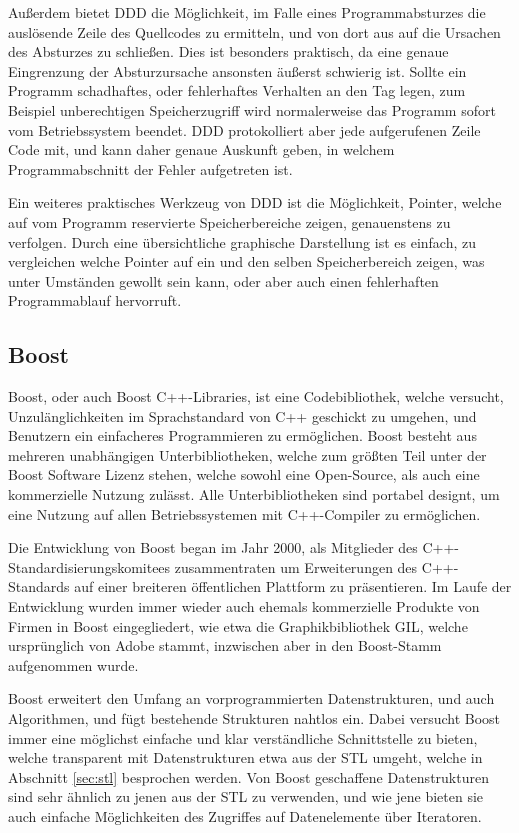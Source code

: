 Außerdem bietet DDD die Möglichkeit, im Falle eines Programmabsturzes die auslösende Zeile des Quellcodes zu ermitteln, und von dort aus auf die Ursachen des Absturzes zu schließen. Dies ist besonders
praktisch, da eine genaue Eingrenzung der Absturzursache ansonsten äußerst schwierig ist. Sollte ein Programm schadhaftes, oder fehlerhaftes Verhalten an den Tag legen, zum Beispiel unberechtigen Speicherzugriff
wird normalerweise das Programm sofort vom Betriebssystem beendet. DDD protokolliert aber jede aufgerufenen Zeile Code mit, und kann daher genaue Auskunft geben, in welchem Programmabschnitt der
Fehler aufgetreten ist.

Ein weiteres praktisches Werkzeug von DDD ist die Möglichkeit, Pointer, welche auf vom Programm reservierte Speicherbereiche zeigen, genauenstens zu verfolgen. Durch eine übersichtliche graphische Darstellung
ist es einfach, zu vergleichen welche Pointer auf ein und den selben Speicherbereich zeigen, was unter Umständen gewollt sein kann, oder aber auch einen fehlerhaften Programmablauf hervorruft.

\subsection{Boost}
Boost, oder auch Boost C++-Libraries, ist eine Codebibliothek, welche versucht, Un\-zu\-läng\-lich\-keiten im Sprachstandard von C++ geschickt zu umgehen, und Benutzern ein einfacheres Programmieren zu ermöglichen.
Boost besteht aus mehreren unabhängigen Unterbibliotheken, welche zum größten Teil unter der Boost Software Lizenz stehen, welche sowohl eine Open-Source, als auch eine kommerzielle Nutzung zulässt. Alle
Unterbibliotheken sind portabel designt, um eine Nutzung auf allen Betriebssystemen mit C++-Compiler zu ermöglichen. 

Die Entwicklung von Boost began im Jahr 2000, als Mitglieder des C++\--Standardisierungs\-komitees zusammentraten um Erweiterungen des C++-Standards auf einer breiteren öffentlichen Plattform zu präsentieren.
Im Laufe der Entwicklung wurden immer wieder auch ehemals kommerzielle Produkte von Firmen in Boost eingegliedert, wie etwa die Graphikbibliothek GIL, welche ursprünglich von Adobe stammt, inzwischen
aber in den Boost-Stamm aufgenommen wurde.

Boost erweitert den Umfang an vorprogrammierten Datenstrukturen, und auch Algorithmen, und fügt bestehende Strukturen nahtlos ein. Dabei versucht Boost immer eine möglichst einfache und klar verständliche
Schnittstelle zu bieten, welche transparent mit Datenstrukturen etwa aus der STL umgeht, welche in Abschnitt \ref{sec:stl} besprochen werden. Von Boost geschaffene Datenstrukturen sind sehr ähnlich zu jenen
aus der STL zu verwenden, und wie jene bieten sie auch einfache Möglichkeiten des Zugriffes auf Datenelemente über Iteratoren. 

